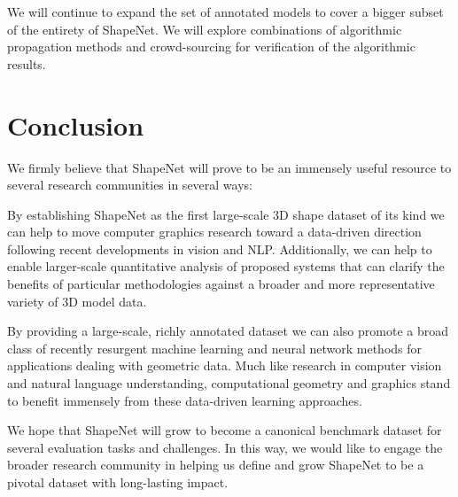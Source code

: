  We will continue to expand the set of annotated models to cover a bigger subset of the entirety of ShapeNet. We will explore combinations of algorithmic propagation methods and crowd-sourcing for verification of the algorithmic results.

\vfill

\section{Conclusion}
\label{sec:conclusion}
We firmly believe that ShapeNet will prove to be an immensely useful resource to several research communities in several ways:

 By establishing ShapeNet as the first large-scale 3D shape dataset of its kind we can help to move computer graphics research toward a data-driven direction following recent developments in vision and NLP. Additionally, we can help to enable larger-scale quantitative analysis of proposed systems that can clarify the benefits of particular methodologies against a broader and more representative variety of 3D model data.

 By providing a large-scale, richly annotated dataset we can also promote a broad class of recently resurgent machine learning and neural network methods for applications dealing with geometric data. Much like research in computer vision and natural language understanding, computational geometry and graphics stand to benefit immensely from these data-driven learning approaches.

 We hope that ShapeNet will grow to become a canonical benchmark dataset for several evaluation tasks and challenges.  In this way, we would like to engage the broader research community in helping us define and grow ShapeNet to be a pivotal dataset with long-lasting impact.

\begin{small}
\end{small}

\newpage


